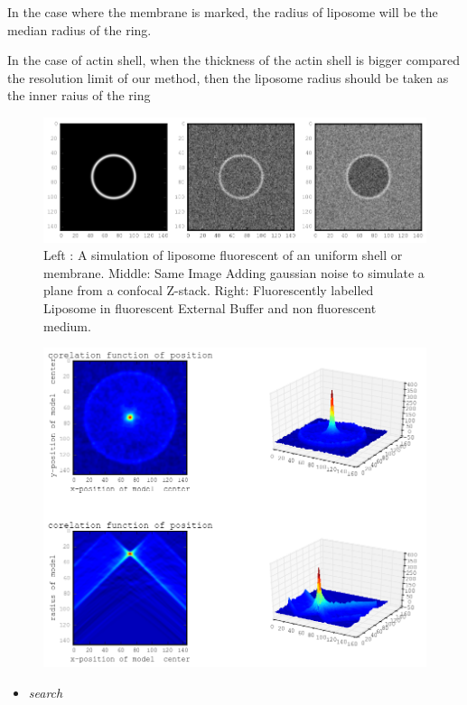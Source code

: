 \documentclass[A4paperpaper,11pt,english]{sphinxmanual}
\begin{document}
In the case where the membrane is marked, the radius of liposome will be the median radius of the ring.

In the case of actin shell, when the thickness of the actin shell is bigger compared the resolution limit of our method, then the liposome radius should be taken as the inner raius of the ring
\begin{figure}[htbp]
\centering
\capstart

\includegraphics{modl-2d-doublet.png}
\caption{Left : A simulation of liposome fluorescent of an uniform shell or
membrane.
Middle: Same Image Adding gaussian noise to simulate a plane from
a confocal Z-stack.
Right: Fluorescently labelled Liposome in fluorescent External Buffer
and non fluorescent medium.}\end{figure}
\begin{figure}[htbp]
\centering

\includegraphics{corrfun-noise-.png}
\end{figure}
\begin{itemize}
\item {} 
\emph{search}

\end{itemize}
\end{document}
